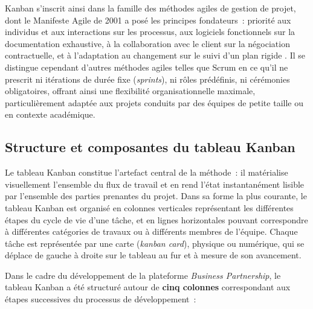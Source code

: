 Kanban s'inscrit ainsi dans la famille des méthodes agiles de gestion
de projet, dont le Manifeste Agile de 2001 a posé les principes
fondateurs~: priorité aux individus et aux interactions sur les
processus, aux logiciels fonctionnels sur la documentation exhaustive,
à la collaboration avec le client sur la négociation contractuelle,
et à l'adaptation au changement sur le suivi d'un plan rigide
\cite{beck_2001}. Il se distingue cependant d'autres méthodes agiles
telles que Scrum en ce qu'il ne prescrit ni itérations de durée fixe
(\textit{sprints}), ni rôles prédéfinis, ni cérémonies obligatoires,
offrant ainsi une flexibilité organisationnelle maximale, particulièrement
adaptée aux projets conduits par des équipes de petite taille ou en
contexte académique.

\subsection{Structure et composantes du tableau Kanban}
\label{subsec:kanban_tableau}

Le tableau Kanban constitue l'artefact central de la méthode~: il
matérialise visuellement l'ensemble du flux de travail et en rend
l'état instantanément lisible par l'ensemble des parties prenantes
du projet. Dans sa forme la plus courante, le tableau Kanban est
organisé en colonnes verticales représentant les différentes étapes
du cycle de vie d'une tâche, et en lignes horizontales pouvant
correspondre à différentes catégories de travaux ou à différents
membres de l'équipe. Chaque tâche est représentée par une carte
(\textit{kanban card}), physique ou numérique, qui se déplace de
gauche à droite sur le tableau au fur et à mesure de son avancement.

Dans le cadre du développement de la plateforme \textit{Business
	Partnership}, le tableau Kanban a été structuré autour de
\textbf{cinq colonnes} correspondant aux étapes successives du
processus de développement~:

